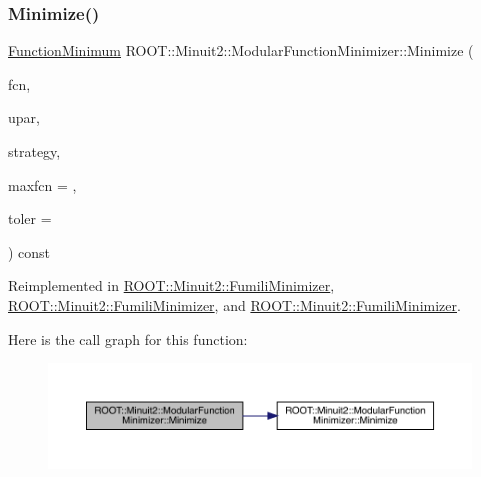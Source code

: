 \subsubsection{\texorpdfstring{Minimize()}{Minimize()}\hspace{0.1cm}{\footnotesize\ttfamily [18/33]}}
{\footnotesize\ttfamily \mbox{\hyperlink{classROOT_1_1Minuit2_1_1FunctionMinimum}{Function\+Minimum}} R\+O\+O\+T\+::\+Minuit2\+::\+Modular\+Function\+Minimizer\+::\+Minimize (\begin{DoxyParamCaption}\item[{const \mbox{\hyperlink{classROOT_1_1Minuit2_1_1FCNGradientBase}{F\+C\+N\+Gradient\+Base}} \&}]{fcn,  }\item[{const \mbox{\hyperlink{classROOT_1_1Minuit2_1_1MnUserParameters}{Mn\+User\+Parameters}} \&}]{upar,  }\item[{const \mbox{\hyperlink{classROOT_1_1Minuit2_1_1MnStrategy}{Mn\+Strategy}} \&}]{strategy,  }\item[{unsigned int}]{maxfcn = {},  }\item[{double}]{toler = {} }\end{DoxyParamCaption}) const\hspace{0.3cm}{\ttfamily [virtual]}}



Reimplemented in \mbox{\hyperlink{classROOT_1_1Minuit2_1_1FumiliMinimizer_a2b14890a2b40ae8db356b71be505ce66}{R\+O\+O\+T\+::\+Minuit2\+::\+Fumili\+Minimizer}}, \mbox{\hyperlink{classROOT_1_1Minuit2_1_1FumiliMinimizer_a2b14890a2b40ae8db356b71be505ce66}{R\+O\+O\+T\+::\+Minuit2\+::\+Fumili\+Minimizer}}, and \mbox{\hyperlink{classROOT_1_1Minuit2_1_1FumiliMinimizer_a2b14890a2b40ae8db356b71be505ce66}{R\+O\+O\+T\+::\+Minuit2\+::\+Fumili\+Minimizer}}.

Here is the call graph for this function\+:
\nopagebreak
\begin{figure}[H]
\begin{center}
\leavevmode
\includegraphics[width=350pt]{d3/dc8/classROOT_1_1Minuit2_1_1ModularFunctionMinimizer_a0340c3524916d898de2a4ac4364452ad_cgraph}
\end{center}
\end{figure}
\mbox{\label{classROOT_1_1Minuit2_1_1ModularFunctionMinimizer_acb99ccb1a23b88947ee5996c03c584ff}} 
